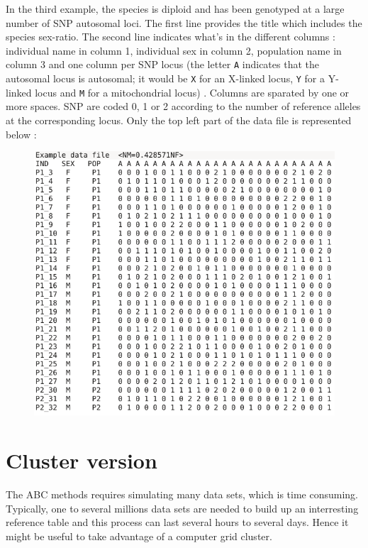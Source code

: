 In the third example, the species is diploid and has been genotyped at a large number of SNP autosomal loci. The first line provides the title which includes the species sex-ratio. The second line indicates what's in the different columns : individual name in column 1, individual sex in column 2, population name in column 3 and one column per SNP locus (the letter \texttt{A} indicates that the autosomal locus is autosomal; it would be \texttt{X} for an X-linked locus, \texttt{Y} for a Y-linked locus and \texttt{M} for a mitochondrial locus) . Columns are sparated by one or more spaces. SNP are coded 0, 1 or 2 according to the number of reference alleles at the corresponding locus. Only the top left part of the data file is represented below :

\begin{figure}[h]
\includegraphics[scale=0.5]{gui_pictures/screenga003.png}
\end{figure}



\clearpage
\section{Cluster version}\label{cluster}
The ABC methods requires simulating many data sets, which is time consuming. Typically, one to several millions data sets are needed to build up an interresting reference table and this process can last several hours to several days. Hence it might be useful to take advantage of a computer grid cluster.

